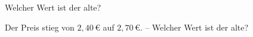 \setcounter{aufgabe}{22}

\begin{aufgabe}{Welcher Wert ist der alte?}
\begin{teile}
\teil Der Preis stieg von $2{,}40\,€$ auf $2{,}70\,€$. – Welcher Wert ist der alte?
\end{teile}
\end{aufgabe}

